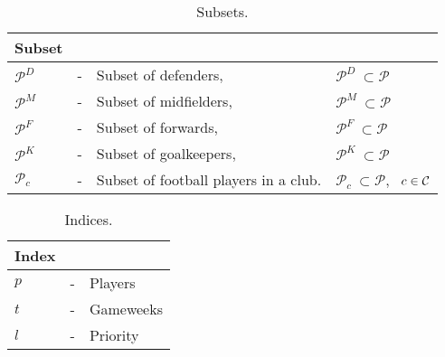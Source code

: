 \begin{table}[H]
\centering
\caption{Subsets.}
\begin{tabular}{@{}llll@{}}
\toprule
Subset            &   &                                       &                                                                                         \\ \midrule
$\mathcal{P}^{D}$ & - & Subset of defenders,                  & \quad  $\mathcal{P}^{D} \ \subset \mathcal{P}$                                            \\
$\mathcal{P}^{M}$ & - & Subset of midfielders,                & \quad $\mathcal{P}^{M} \ \subset \mathcal{P}$                                             \\
$\mathcal{P}^{F}$ & - & Subset of forwards,                   & \quad $\mathcal{P}^{F} \ \subset \mathcal{P}$                                             \\
$\mathcal{P}^{K}$ & - & Subset of goalkeepers,                & \quad $\mathcal{P}^{K} \ \subset \mathcal{P}$                                             \\
$\mathcal{P}_{c}$ & - & Subset of football players in a club. & \quad $\mathcal{P}_{c} \ \subset \mathcal{P}$, $\enskip c \in \mathcal{C}$  \\ \bottomrule
\end{tabular}
\end{table}


\begin{table}[H]
\centering
\caption{Indices.}
\begin{tabular}{@{}lll@{}}
\toprule
Index &   &           \\ \midrule
$p$   & - & Players   \\
$t$   & - & Gameweeks \\
$l$   & - & Priority  \\ \bottomrule
\end{tabular}
\end{table}


